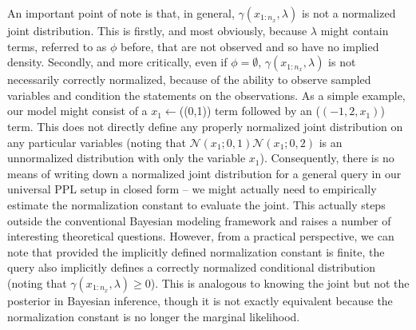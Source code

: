 An important point of note is that, in general, $\gamma(x_{1:n_x}, \lambda)$ is not a normalized joint distribution.  This is firstly,
and most obviously, because $\lambda$ might contain terms, referred to as $\phi$ before, that are not
observed and so have no implied density.  Secondly, and more critically, even if $\phi = \emptyset$,
$\gamma(x_{1:n_x}, \lambda)$ is not necessarily correctly normalized, because of the ability to observe sampled variables 
and condition the \sample statements on the observations. 
As a simple example, our model
might consist of a $x_1 \leftarrow$\sample(\normal(0,1)) term followed by an \observe(\normal$(-1,2,x_1)$)
term.  This does not directly define any properly normalized joint distribution on any particular variables
(noting that $\mathcal{N}(x_1;0,1) \mathcal{N}(x_1;0,2)$ is an unnormalized distribution with only the variable
$x_1$).  Consequently, there is no means of writing down a normalized joint distribution for a general
query in our universal PPL setup in closed form -- we might actually need to empirically estimate
the normalization constant to evaluate the joint.  This actually steps outside the conventional Bayesian
modeling framework and raises a number of interesting theoretical questions.  However, from a
practical perspective, we can note that provided the implicitly defined normalization constant is finite,
the query also implicitly defines a correctly normalized conditional distribution (noting that
$\gamma(x_{1:n_x}, \lambda) \ge0$).
This is analogous to knowing the joint but not the posterior in Bayesian inference, though it is not exactly
equivalent because the normalization constant is no longer the marginal likelihood.

